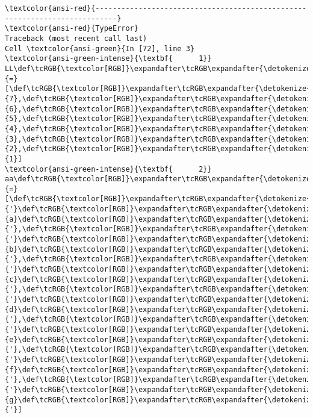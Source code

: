 \documentclass[11pt]{article}
\begin{document}
    \begin{Verbatim}[commandchars=\\\{\}, frame=single, framerule=2mm, rulecolor=\color{outerrorbackground}]
\textcolor{ansi-red}{---------------------------------------------------------------------------}
\textcolor{ansi-red}{TypeError}                                 Traceback (most recent call last)
Cell \textcolor{ansi-green}{In [72], line 3}
\textcolor{ansi-green-intense}{\textbf{      1}} LL\def\tcRGB{\textcolor[RGB]}\expandafter\tcRGB\expandafter{\detokenize{98,98,98}}{=}[\def\tcRGB{\textcolor[RGB]}\expandafter\tcRGB\expandafter{\detokenize{98,98,98}}{7},\def\tcRGB{\textcolor[RGB]}\expandafter\tcRGB\expandafter{\detokenize{98,98,98}}{6},\def\tcRGB{\textcolor[RGB]}\expandafter\tcRGB\expandafter{\detokenize{98,98,98}}{5},\def\tcRGB{\textcolor[RGB]}\expandafter\tcRGB\expandafter{\detokenize{98,98,98}}{4},\def\tcRGB{\textcolor[RGB]}\expandafter\tcRGB\expandafter{\detokenize{98,98,98}}{3},\def\tcRGB{\textcolor[RGB]}\expandafter\tcRGB\expandafter{\detokenize{98,98,98}}{2},\def\tcRGB{\textcolor[RGB]}\expandafter\tcRGB\expandafter{\detokenize{98,98,98}}{1}]
\textcolor{ansi-green-intense}{\textbf{      2}} aa\def\tcRGB{\textcolor[RGB]}\expandafter\tcRGB\expandafter{\detokenize{98,98,98}}{=}[\def\tcRGB{\textcolor[RGB]}\expandafter\tcRGB\expandafter{\detokenize{175,0,0}}{'}\def\tcRGB{\textcolor[RGB]}\expandafter\tcRGB\expandafter{\detokenize{175,0,0}}{a}\def\tcRGB{\textcolor[RGB]}\expandafter\tcRGB\expandafter{\detokenize{175,0,0}}{'},\def\tcRGB{\textcolor[RGB]}\expandafter\tcRGB\expandafter{\detokenize{175,0,0}}{'}\def\tcRGB{\textcolor[RGB]}\expandafter\tcRGB\expandafter{\detokenize{175,0,0}}{b}\def\tcRGB{\textcolor[RGB]}\expandafter\tcRGB\expandafter{\detokenize{175,0,0}}{'},\def\tcRGB{\textcolor[RGB]}\expandafter\tcRGB\expandafter{\detokenize{175,0,0}}{'}\def\tcRGB{\textcolor[RGB]}\expandafter\tcRGB\expandafter{\detokenize{175,0,0}}{c}\def\tcRGB{\textcolor[RGB]}\expandafter\tcRGB\expandafter{\detokenize{175,0,0}}{'},\def\tcRGB{\textcolor[RGB]}\expandafter\tcRGB\expandafter{\detokenize{175,0,0}}{'}\def\tcRGB{\textcolor[RGB]}\expandafter\tcRGB\expandafter{\detokenize{175,0,0}}{d}\def\tcRGB{\textcolor[RGB]}\expandafter\tcRGB\expandafter{\detokenize{175,0,0}}{'},\def\tcRGB{\textcolor[RGB]}\expandafter\tcRGB\expandafter{\detokenize{175,0,0}}{'}\def\tcRGB{\textcolor[RGB]}\expandafter\tcRGB\expandafter{\detokenize{175,0,0}}{e}\def\tcRGB{\textcolor[RGB]}\expandafter\tcRGB\expandafter{\detokenize{175,0,0}}{'},\def\tcRGB{\textcolor[RGB]}\expandafter\tcRGB\expandafter{\detokenize{175,0,0}}{'}\def\tcRGB{\textcolor[RGB]}\expandafter\tcRGB\expandafter{\detokenize{175,0,0}}{f}\def\tcRGB{\textcolor[RGB]}\expandafter\tcRGB\expandafter{\detokenize{175,0,0}}{'},\def\tcRGB{\textcolor[RGB]}\expandafter\tcRGB\expandafter{\detokenize{175,0,0}}{'}\def\tcRGB{\textcolor[RGB]}\expandafter\tcRGB\expandafter{\detokenize{175,0,0}}{g}\def\tcRGB{\textcolor[RGB]}\expandafter\tcRGB\expandafter{\detokenize{175,0,0}}{'}]

\end{Verbatim}
\end{document}
